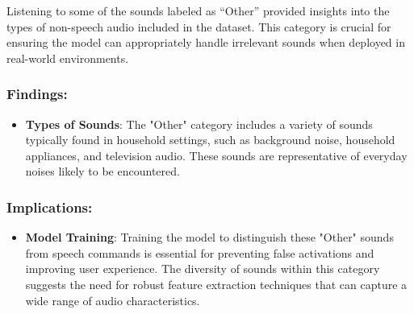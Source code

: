 Listening to some of the sounds labeled as “Other” provided insights into the types of non-speech audio included in the dataset. This category is crucial for ensuring the model can appropriately handle irrelevant sounds when deployed in real-world environments.

\subsubsection{Findings:}

\begin{itemize}
    \item \textbf{Types of Sounds}: The "Other" category includes a variety of sounds typically found in household settings, such as background noise, household appliances, and television audio. These sounds are representative of everyday noises likely to be encountered.
\end{itemize}

\subsubsection{Implications:}

\begin{itemize}
    \item \textbf{Model Training}: Training the model to distinguish these "Other" sounds from speech commands is essential for preventing false activations and improving user experience. The diversity of sounds within this category suggests the need for robust feature extraction techniques that can capture a wide range of audio characteristics.
\end{itemize}
